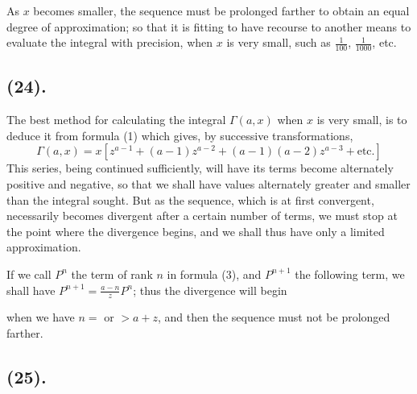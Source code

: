 \documentclass{article}
\begin{document}
As $x$ becomes smaller, the sequence must be prolonged farther to obtain an equal degree of approximation; so that it is fitting to have recourse to another means to evaluate the integral with precision, when $x$ is very small, such as $\frac{1}{100}$, $\frac{1}{1000}$, etc.

\subsection*{(24).}

The best method for calculating the integral $\Gamma(a,x)$ when $x$ is very small, is to deduce it from formula (1) which gives, by successive transformations,
\[ \Gamma(a,x)=x[z^{a-1}+(a-1)z^{a-2}+(a-1)(a-2)z^{a-3}+\text{etc.}] \tag{3} \]
This series, being continued sufficiently, will have its terms become alternately positive and negative, so that we shall have values alternately greater and smaller than the integral sought. But as the sequence, which is at first convergent, necessarily becomes divergent after a certain number of terms, we must stop at the point where the divergence begins, and we shall thus have only a limited approximation.

If we call $P^{n}$ the term of rank $n$ in formula (3), and $P^{n+1}$ the following term, we shall have $P^{n+1}=\frac{a-n}{z}P^{n}$; thus the divergence will begin

when we have $n=$ or $>a+z$, and then the sequence must not be prolonged farther.

\subsection*{(25).}
\end{document}
